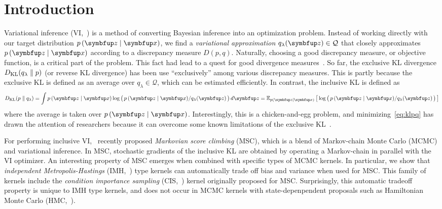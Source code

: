 
\section{Introduction}
Variational inference (VI,~\citealt{jordan_introduction_1999, blei_variational_2017}) is a method of converting Bayesian inference into an optimization problem.
Instead of working directly with our target distribution \(p\,(\vz\mid\vx)\), we find a \textit{variational approximation} \(q_{\lambda}(\vz) \in \mathcal{Q}\) that closely approximates \(p\,(\vz\mid\vx)\) according to a discrepancy measure \(D(p, q)\).
Naturally, choosing a good discrepancy measure, or objective function, is a critical part of the problem.
This fact had lead to a quest for good divergence measures~\citep{NIPS2016_7750ca35, NIPS2017_35464c84, NEURIPS2018_1cd138d0, pmlr-v97-ruiz19a}.
So far, the exclusive KL divergence \(D_{\mathrm{KL}}(q_{\lambda}\parallel p)\) (or reverse KL divergence) has been use ``exclusively'' among various discrepancy measures.
This is partly because the exclusive KL is defined as an average over \(q_{\lambda} \in \mathcal{Q}\), which can be estimated efficiently.
In contrast, the inclusive KL is defined as
%
\begin{align}
  \DKL{p}{q_{\lambda}} = \int p\,(\vz\mid\vx) \log\big(\, p\,(\vz\mid\vx)/q_{\lambda}(\vz) \,\big)\,d\vz
  = \Esub{p(\vz\mid\vx)}{\log\big(\, p\,(\vz\mid\vx)/q_{\lambda}(\vz) \,\big) } \label{eq:klpq}
\end{align}
%
where the average is taken over \(p\,(\vz\mid\vx)\). 
Interestingly, this is a chicken-and-egg problem, and minimizing~\eqref{eq:klpq} has drawn the attention of researchers because it can overcome some known limitations of the exclusive KL~\citep{minka2005divergence, mackay_local_2001}.

For performing inclusive VI,~\citet{NEURIPS2020_b2070693, pmlr-v124-ou20a} recently proposed \textit{Markovian score climbing} (MSC), which is a blend of Markov-chain Monte Carlo (MCMC) and variational inference.
In MSC, stochastic gradients of the inclusive KL are obtained by operating a Markov-chain in parallel with the VI optimizer.
An interesting property of MSC emerges when combined with specific types of MCMC kernels.
In particular, we show that \textit{independent Metropolis-Hastings} (IMH,~\citealt{robert_monte_2004}) type kernels can automatically trade off bias and variance when used for MSC.
This family of kernels include the \textit{condition importance sampling} (CIS,~\citealt{NEURIPS2020_b2070693}) kernel originally proposed for MSC.
Surprisingly, this automatic tradeoff property is unique to IMH type kernels, and does not occur in MCMC kernels with state-depenpendent proposals such as Hamiltonian Monte Carlo (HMC,~\citealt{duane_hybrid_1987, neal_mcmc_2011, betancourt_conceptual_2017}).

